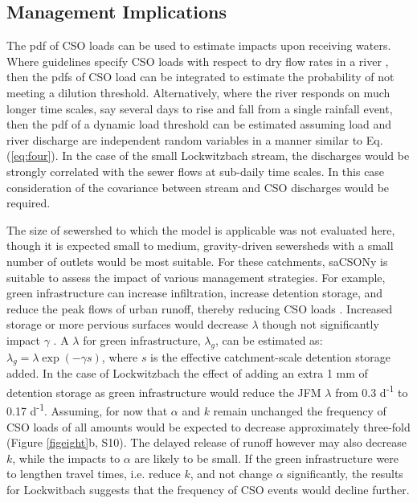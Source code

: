 \documentclass[draft,linenumbers]{agujournal2018}
\begin{document}
\subsection{Management Implications}
The pdf of CSO loads can be used to estimate impacts upon receiving waters. Where guidelines specify CSO loads with respect to dry f\/low rates in a river \citep{Holzer_1998}, then the pdfs of CSO load can be integrated to estimate the probability of not meeting a dilution threshold. Alternatively, where the river responds on much longer time scales, say several days to rise and fall from a single rainfall event, then the pdf of a dynamic load threshold can be estimated assuming load and river discharge are independent random variables in a manner similar to Eq. (\ref{eq:four}). In the case of the small Lockwitzbach stream, the discharges would be strongly correlated with the sewer f\/lows at sub-daily time scales. In this case consideration of the covariance between stream and CSO discharges would be required.

The size of sewershed to which the model is applicable was not evaluated here, though it is expected small to medium, gravity-driven sewersheds with a small number of outlets would be most suitable. For these catchments, saCSONy is suitable to assess the impact of various management strategies. For example, green infrastructure can increase inf\/iltration, increase detention storage, and reduce the peak f\/lows of urban runof\/f, thereby reducing CSO loads \citep{Riechel_2016}. Increased storage or more pervious surfaces would decrease $\lambda$ though not signif\/icantly impact $\gamma$ \citep{Rodriguez_Iturbe_1999}. A $\lambda$ for green infrastructure, $\lambda_g$, can be estimated as: $\lambda_g = \lambda \exp⁡(-\gamma s)$, where $s$ is the ef\/fective catchment-scale detention storage added. In the case of Lockwitzbach the ef\/fect of adding an extra 1 mm of detention storage as green infrastructure would reduce the JFM $\lambda$  from 0.3 d\textsuperscript{-1} to 0.17 d\textsuperscript{-1}. Assuming, for now that $\alpha$ and $k$ remain unchanged the frequency of CSO loads of all amounts would be expected to decrease approximately three-fold (Figure \ref{figeight}b, S10). The delayed release of runof\/f however may also decrease $k$, while the impacts to $\alpha$ are likely to be small. If the green infrastructure were to lengthen travel times, i.e. reduce $k$, and not change $\alpha$ signif\/icantly, the results for Lockwitbach suggests that the frequency of CSO events would decline further. %
\end{document}
